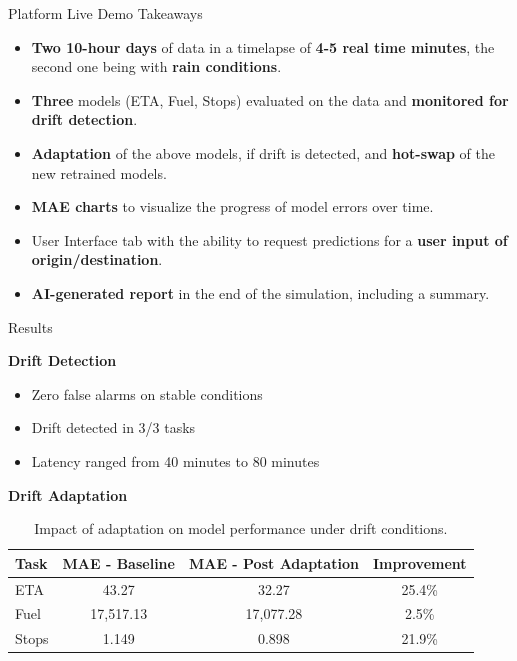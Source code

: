 \documentclass[aspectratio=169,11pt]{beamer}
\begin{document}
\begin{frame}{Platform Live Demo Takeaways}

    \begin{itemize}
        \item \textbf{Two 10-hour days} of data in a timelapse of \textbf{4-5 real time minutes}, the second one being with \textbf{rain conditions}.
        \item \textbf{Three} models (ETA, Fuel, Stops) evaluated on the data and \textbf{monitored for drift detection}.
        \item \textbf{Adaptation} of the above models, if drift is detected, and \textbf{hot-swap} of the new retrained models.
        \item \textbf{MAE charts} to visualize the progress of model errors over time.
        \item User Interface tab with the ability to request predictions for a \textbf{user input of origin/destination}.
        \item \textbf{AI-generated report} in the end of the simulation, including a summary.
    \end{itemize}

\end{frame}

\begin{frame}{Results}

    \textbf{Drift Detection}
    \medskip

    \begin{itemize}
        \item Zero false alarms on stable conditions
        \item Drift detected in 3/3 tasks
        \item Latency ranged from 40 minutes to 80 minutes
    \end{itemize}

    \medskip
    \textbf{Drift Adaptation}

    \begin{table}[htbp]
        \centering
        \caption{Impact of adaptation on model performance under drift conditions.}
        \label{tab:retraining_results}
        \small
        \begin{tabular}{lccc}
            \hline
            \textbf{Task} & \textbf{MAE - Baseline} & \textbf{MAE - Post Adaptation} & \textbf{Improvement} \\
            \hline
            ETA   & 43.27       & 32.27       & 25.4\% \\
            Fuel  & 17{,}517.13 & 17{,}077.28 & 2.5\% \\
            Stops & 1.149       & 0.898       & 21.9\% \\
            \hline
        \end{tabular}
    \end{table}

\end{frame}
\end{document}
